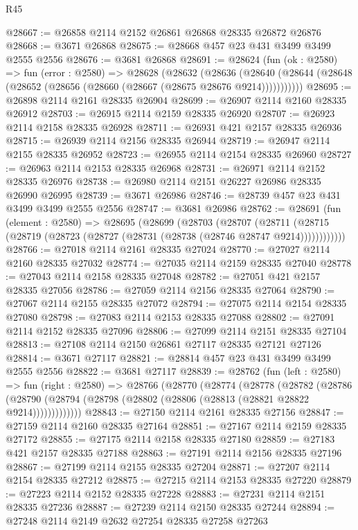 \begin{lexlean}{R45}
\begin{coremodule}
@28667 := @26858 @2114 @2152 @26861 @26868 @28335 @26872 @26876
@28668 := @3671 @26868
@28675 := @28668 @457 @23 @431 @3499 @3499 @2555 @2556
@28676 := @3681 @26868
@28691 := @28624
    (fun (ok : @2580) =>
    fun (error : @2580) =>
    @28628
      (@28632
        (@28636
          (@28640 (@28644 (@28648 (@28652 (@28656 (@28660 (@28667 (@28675 @28676 @9214)))))))))))
@28695 := @26898 @2114 @2161 @28335 @26904
@28699 := @26907 @2114 @2160 @28335 @26912
@28703 := @26915 @2114 @2159 @28335 @26920
@28707 := @26923 @2114 @2158 @28335 @26928
@28711 := @26931 @421 @2157 @28335 @26936
@28715 := @26939 @2114 @2156 @28335 @26944
@28719 := @26947 @2114 @2155 @28335 @26952
@28723 := @26955 @2114 @2154 @28335 @26960
@28727 := @26963 @2114 @2153 @28335 @26968
@28731 := @26971 @2114 @2152 @28335 @26976
@28738 := @26980 @2114 @2151 @26227 @26986 @28335 @26990 @26995
@28739 := @3671 @26986
@28746 := @28739 @457 @23 @431 @3499 @3499 @2555 @2556
@28747 := @3681 @26986
@28762 := @28691
    (fun (element : @2580) =>
    @28695
      (@28699
        (@28703
          (@28707
            (@28711 (@28715 (@28719 (@28723 (@28727 (@28731 (@28738 (@28746 @28747 @9214))))))))))))
@28766 := @27018 @2114 @2161 @28335 @27024
@28770 := @27027 @2114 @2160 @28335 @27032
@28774 := @27035 @2114 @2159 @28335 @27040
@28778 := @27043 @2114 @2158 @28335 @27048
@28782 := @27051 @421 @2157 @28335 @27056
@28786 := @27059 @2114 @2156 @28335 @27064
@28790 := @27067 @2114 @2155 @28335 @27072
@28794 := @27075 @2114 @2154 @28335 @27080
@28798 := @27083 @2114 @2153 @28335 @27088
@28802 := @27091 @2114 @2152 @28335 @27096
@28806 := @27099 @2114 @2151 @28335 @27104
@28813 := @27108 @2114 @2150 @26861 @27117 @28335 @27121 @27126
@28814 := @3671 @27117
@28821 := @28814 @457 @23 @431 @3499 @3499 @2555 @2556
@28822 := @3681 @27117
@28839 := @28762
    (fun (left : @2580) =>
    fun (right : @2580) =>
    @28766
      (@28770
        (@28774
          (@28778
            (@28782
              (@28786
                (@28790 (@28794 (@28798 (@28802 (@28806 (@28813 (@28821 @28822 @9214)))))))))))))
@28843 := @27150 @2114 @2161 @28335 @27156
@28847 := @27159 @2114 @2160 @28335 @27164
@28851 := @27167 @2114 @2159 @28335 @27172
@28855 := @27175 @2114 @2158 @28335 @27180
@28859 := @27183 @421 @2157 @28335 @27188
@28863 := @27191 @2114 @2156 @28335 @27196
@28867 := @27199 @2114 @2155 @28335 @27204
@28871 := @27207 @2114 @2154 @28335 @27212
@28875 := @27215 @2114 @2153 @28335 @27220
@28879 := @27223 @2114 @2152 @28335 @27228
@28883 := @27231 @2114 @2151 @28335 @27236
@28887 := @27239 @2114 @2150 @28335 @27244
@28894 := @27248 @2114 @2149 @2632 @27254 @28335 @27258 @27263

\end{coremodule}
\end{lexlean}
